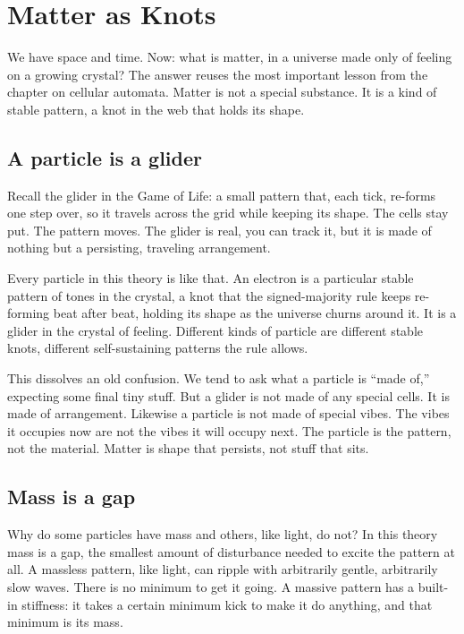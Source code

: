 \section{Matter as Knots}

We have space and time. Now: what is matter, in a universe made only of feeling on a growing crystal? The answer reuses the most important lesson from the chapter on cellular automata. Matter is not a special substance. It is a kind of stable pattern, a knot in the web that holds its shape.

\subsection{A particle is a glider}

Recall the glider in the Game of Life: a small pattern that, each tick, re-forms one step over, so it travels across the grid while keeping its shape. The cells stay put. The pattern moves. The glider is real, you can track it, but it is made of nothing but a persisting, traveling arrangement.

Every particle in this theory is like that. An electron is a particular stable pattern of tones in the crystal, a knot that the signed-majority rule keeps re-forming beat after beat, holding its shape as the universe churns around it. It is a glider in the crystal of feeling. Different kinds of particle are different stable knots, different self-sustaining patterns the rule allows.

This dissolves an old confusion. We tend to ask what a particle is ``made of,'' expecting some final tiny stuff. But a glider is not made of any special cells. It is made of arrangement. Likewise a particle is not made of special vibes. The vibes it occupies now are not the vibes it will occupy next. The particle is the pattern, not the material. Matter is shape that persists, not stuff that sits.

\subsection{Mass is a gap}

Why do some particles have mass and others, like light, do not? In this theory mass is a gap, the smallest amount of disturbance needed to excite the pattern at all. A massless pattern, like light, can ripple with arbitrarily gentle, arbitrarily slow waves. There is no minimum to get it going. A massive pattern has a built-in stiffness: it takes a certain minimum kick to make it do anything, and that minimum is its mass.

